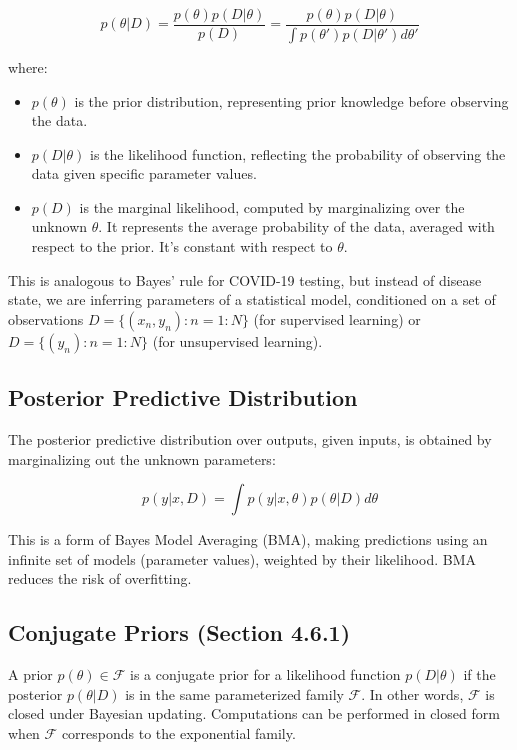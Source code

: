 \documentclass{article}
\begin{document}
$$
p(\theta|D) = \frac{p(\theta)p(D|\theta)}{p(D)} = \frac{p(\theta)p(D|\theta)}{\int p(\theta')p(D|\theta')d\theta'}
$$

where:

\begin{itemize}
    \item $p(\theta)$ is the prior distribution, representing prior knowledge before observing the data.
    \item $p(D|\theta)$ is the likelihood function, reflecting the probability of observing the data given specific parameter values.
    \item $p(D)$ is the marginal likelihood, computed by marginalizing over the unknown $\theta$. It represents the average probability of the data, averaged with respect to the prior. It's constant with respect to $\theta$.
\end{itemize}

This is analogous to Bayes' rule for COVID-19 testing, but instead of disease state, we are inferring parameters of a statistical model, conditioned on a set of observations $D = \{(x_n, y_n) : n = 1 : N\}$ (for supervised learning) or $D = \{(y_n) : n = 1 : N\}$ (for unsupervised learning).

\subsection{Posterior Predictive Distribution}

The posterior predictive distribution over outputs, given inputs, is obtained by marginalizing out the unknown parameters:

$$
p(y|x, D) = \int p(y|x, \theta)p(\theta|D)d\theta
$$

This is a form of Bayes Model Averaging (BMA), making predictions using an infinite set of models (parameter values), weighted by their likelihood. BMA reduces the risk of overfitting.

\subsection{Conjugate Priors (Section 4.6.1)}

A prior $p(\theta) \in \mathcal{F}$ is a conjugate prior for a likelihood function $p(D|\theta)$ if the posterior $p(\theta|D)$ is in the same parameterized family $\mathcal{F}$. In other words, $\mathcal{F}$ is closed under Bayesian updating. Computations can be performed in closed form when $\mathcal{F}$ corresponds to the exponential family.
\end{document}
